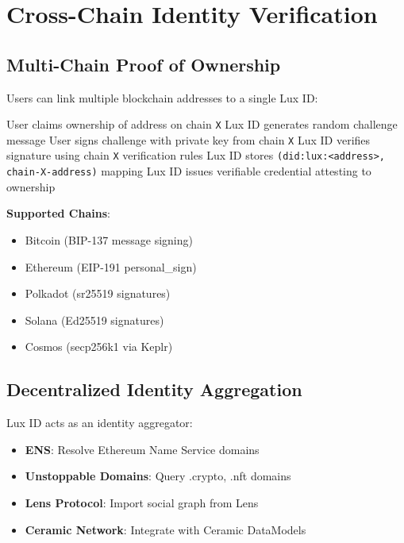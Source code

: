 \section{Cross-Chain Identity Verification}


\subsection{Multi-Chain Proof of Ownership}

Users can link multiple blockchain addresses to a single Lux ID:

\begin{algorithm}
\caption{Cross-Chain Address Linking}
\begin{algorithmic}[1]
\State User claims ownership of address on chain \texttt{X}
\State Lux ID generates random challenge message
\State User signs challenge with private key from chain \texttt{X}
\State Lux ID verifies signature using chain \texttt{X} verification rules
\State Lux ID stores \texttt{(did:lux:<address>, chain-X-address)} mapping
\State Lux ID issues verifiable credential attesting to ownership
\end{algorithmic}
\end{algorithm}

\textbf{Supported Chains}:
\begin{itemize}
  \item Bitcoin (BIP-137 message signing)
  \item Ethereum (EIP-191 personal\_sign)
  \item Polkadot (sr25519 signatures)
  \item Solana (Ed25519 signatures)
  \item Cosmos (secp256k1 via Keplr)
\end{itemize}

\subsection{Decentralized Identity Aggregation}

Lux ID acts as an identity aggregator:
\begin{itemize}
  \item \textbf{ENS}: Resolve Ethereum Name Service domains
  \item \textbf{Unstoppable Domains}: Query .crypto, .nft domains
  \item \textbf{Lens Protocol}: Import social graph from Lens
  \item \textbf{Ceramic Network}: Integrate with Ceramic DataModels
\end{itemize}

